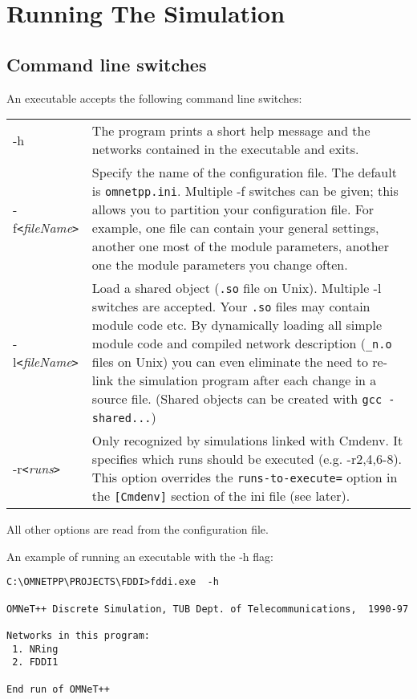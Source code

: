 \chapter{Running The Simulation}
\label{cha:running-the-simulation}


\section{Command line switches}

An {\opp} executable accepts the following command line
switches:

\begin{longtable}{lp{12cm}}
  -h & The program prints a short help message and the networks
  contained  in the executable and exits.\\
  
  -f\texttt{<}\textit{fileName\texttt{>}} & Specify the name of the
  configuration file. The default is \texttt{omnetpp.ini}\index{omnetpp.ini}.
  Multiple -f switches can be given; this allows you to partition your
  configuration file.  For example, one file can contain your general
  settings, another one most of the module parameters, another one the
  module parameters you change often.\\
  
  -l\texttt{<}\textit{fileName\texttt{>}} & Load a shared
  object\index{shared objects} (\texttt{.so} file on Unix).  Multiple
  -l switches are accepted. Your \texttt{.so} files may contain module
  code etc. By dynamically loading all simple
  module code and compiled network description (\texttt{\_n.o} files
  on Unix) you can even eliminate the need to re-link the simulation
  program after each change in a source file.  (Shared objects can be
  created with \texttt{gcc -shared...})\\
  
  -r\texttt{<}\textit{runs\texttt{>}} & Only recognized by simulations
  linked with Cmdenv. It specifies which runs should be executed (e.g.
  -r2,4,6-8). This option overrides the \texttt{runs-to-execute=}
  option in the \texttt{[Cmdenv]} section of the ini file\index{ini file} (see later).\\
\end{longtable}

All other options are read from the configuration file.

An example of running an {\opp} executable with the -h flag:

\begin{Verbatim}
C:\OMNETPP\PROJECTS\FDDI>fddi.exe  -h

OMNeT++ Discrete Simulation, TUB Dept. of Telecommunications,  1990-97

Networks in this program:
 1. NRing
 2. FDDI1

End run of OMNeT++
\end{Verbatim}




